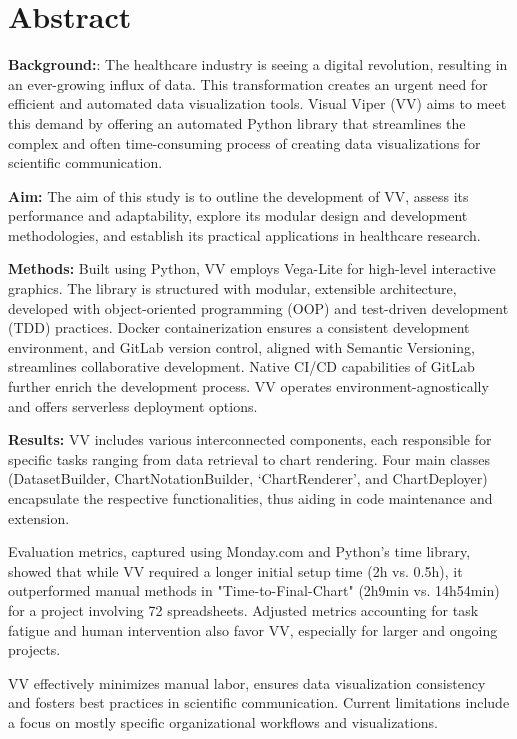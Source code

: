 \chapter*{Abstract}
\thispagestyle{plain}

\textbf{Background:}: The healthcare industry is seeing a digital revolution, resulting in an
ever-growing influx of data. This transformation creates an urgent need
for efficient and automated data visualization tools. Visual Viper (VV)
aims to meet this demand by offering an automated Python library that
streamlines the complex and often time-consuming process of creating
data visualizations for scientific communication.

\textbf{Aim:} The aim of this study is to outline the development of VV, assess its
performance and adaptability, explore its modular design and development
methodologies, and establish its practical applications in healthcare
research.

\textbf{Methods:} Built using Python, VV employs Vega-Lite for high-level interactive
graphics. The library is structured with modular, extensible
architecture, developed with object-oriented programming (OOP) and
test-driven development (TDD) practices. Docker containerization ensures
a consistent development environment, and GitLab version control,
aligned with Semantic Versioning, streamlines collaborative development.
Native CI/CD capabilities of GitLab further enrich the development
process. VV operates environment-agnostically and offers serverless
deployment options.

\textbf{Results:} VV includes various interconnected components, each responsible for
specific tasks ranging from data retrieval to chart rendering. Four main
classes (\textquotesingle DatasetBuilder\textquotesingle,
\textquotesingle ChartNotationBuilder\textquotesingle, `ChartRenderer',
and \textquotesingle ChartDeployer\textquotesingle) encapsulate the
respective functionalities, thus aiding in code maintenance and
extension.

Evaluation metrics, captured using Monday.com and Python's time library,
showed that while VV required a longer initial setup time (2h vs. 0.5h),
it outperformed manual methods in "Time-to-Final-Chart" (2h9min vs.
14h54min) for a project involving 72 spreadsheets. Adjusted metrics
accounting for task fatigue and human intervention also favor VV,
especially for larger and ongoing projects.

VV effectively minimizes manual labor, ensures data visualization
consistency and fosters best practices in scientific communication.
Current limitations include a focus on mostly specific organizational
workflows and visualizations.

